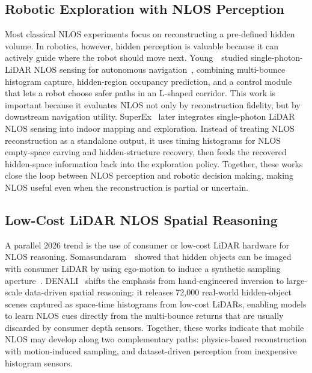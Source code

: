 \subsection{Robotic Exploration with NLOS Perception}
Most classical NLOS experiments focus on reconstructing a pre-defined hidden volume. In robotics, however, hidden perception is valuable because it can actively guide where the robot should move next. Young~\etal~studied single-photon-LiDAR NLOS sensing for autonomous navigation~\cite{youngNavigationNLOS2024}, combining multi-bounce histogram capture, hidden-region occupancy prediction, and a control module that lets a robot choose safer paths in an L-shaped corridor. This work is important because it evaluates NLOS not only by reconstruction fidelity, but by downstream navigation utility. SuperEx~\cite{gargSuperEx2025} later integrates single-photon LiDAR NLOS sensing into indoor mapping and exploration. Instead of treating NLOS reconstruction as a standalone output, it uses timing histograms for NLOS empty-space carving and hidden-structure recovery, then feeds the recovered hidden-space information back into the exploration policy. Together, these works close the loop between NLOS perception and robotic decision making, making NLOS useful even when the reconstruction is partial or uncertain.

\subsection{Low-Cost LiDAR NLOS Spatial Reasoning}
A parallel 2026 trend is the use of consumer or low-cost LiDAR hardware for NLOS reasoning. Somasundaram~\etal~showed that hidden objects can be imaged with consumer LiDAR by using ego-motion to induce a synthetic sampling aperture~\cite{somasundaramConsumerLiDARNLOS2026}. DENALI~\cite{behariDENALI2026} shifts the emphasis from hand-engineered inversion to large-scale data-driven spatial reasoning: it releases 72,000 real-world hidden-object scenes captured as space-time histograms from low-cost LiDARs, enabling models to learn NLOS cues directly from the multi-bounce returns that are usually discarded by consumer depth sensors. Together, these works indicate that mobile NLOS may develop along two complementary paths: physics-based reconstruction with motion-induced sampling, and dataset-driven perception from inexpensive histogram sensors.

